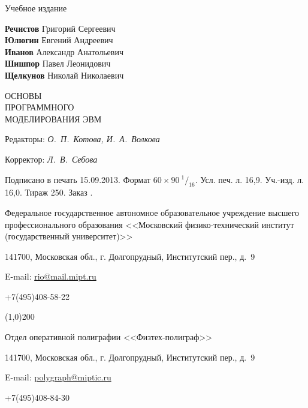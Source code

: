 \thispagestyle{empty}
\begingroup
\small
\parindent=0pt %

\begin{center}

\begin{normalsize}
\textsf{Учебное издание}
\end{normalsize}

\vfill

\begin{normalsize}
\textbf{Речистов} Григорий Сергеевич\\
\textbf{Юлюгин} Евгений Андреевич\\
\textbf{Иванов} Александр Анатольевич\\
\textbf{Шишпор} Павел Леонидович\\
\textbf{Щелкунов} Николай Николаевич\\


\end{normalsize}

\vfill

\begin{large}
ОСНОВЫ\\

ПРОГРАММНОГО\\
\vspace{3pt}
МОДЕЛИРОВАНИЯ ЭВМ
\end{large}
\end{center}

\vfill

Редакторы: \textit{О.~П.~Котова, И.~А.~Волкова}

Корректор: \textit{ Л.~В.~Себова}

\medskip

Подписано в печать 15.09.2013. Формат $60 \times 90\ {^1}/_{16}$. Усл. печ. л. 16,9. Уч.-изд. л. 16,0. Тираж 250. Заказ .

Федеральное государственное автономное образовательное учреждение высшего профессионального образования <<Московский физико-тех\-ни\-чес\-кий институт (госу\-дар\-ствен\-ный университет)>>

141700, Московская обл., г. Долгопрудный, Институтский пер., д.~9

E-mail: \href{mailto:rio@mail.mipt.ru}{rio@mail.mipt.ru}

+7(495)408-58-22

\line(1,0){200}

Отдел оперативной полиграфии <<Физтех-полиграф>>

141700, Московская обл., г. Долгопрудный, Институтский пер., д.~9

E-mail: \href{mailto:polygraph@miptic.ru}{polygraph@miptic.ru}

+7(495)408-84-30
\endgroup
{}\label{page:lastpage}